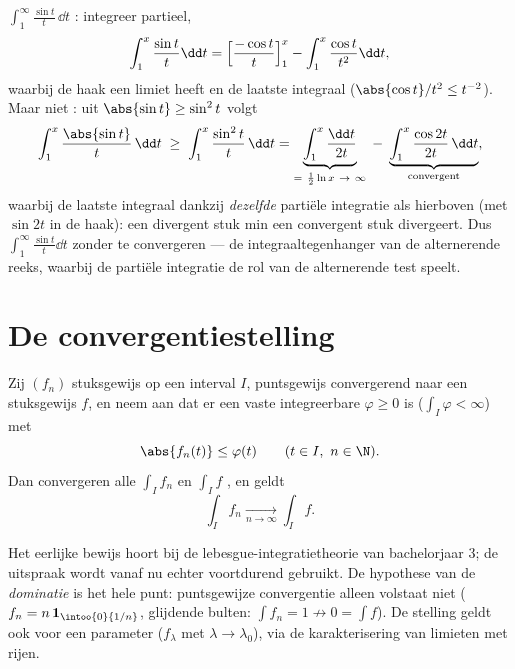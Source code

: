 \begin{example}\label{ex:b2:integration:sint}
$\displaystyle\int_1^{\infty} \frac{\sin t}{t}\,\dd t$
: integreer partieel,
\[
\int_1^x \frac{\sin t}{t}\dd t
= \Bigl[\frac{-\cos t}{t}\Bigr]_1^x - \int_1^x \frac{\cos
t}{t^2}\dd t ,
\]
waarbij de haak een limiet heeft en de laatste integraal 
 ($\abs{\cos t}/t^2 \leq t^{-2}$). Maar niet :
uit $\abs{\sin t} \geq \sin^2 t$ volgt
\[
\int_1^x \frac{\abs{\sin t}}{t}\,\dd t
\;\geq\; \int_1^x \frac{\sin^2t}{t}\,\dd t
= \underbrace{\int_1^x \frac{\dd t}{2t}}_{=\ \frac12\ln x
\ \to\ \infty}
\;-\; \underbrace{\int_1^x \frac{\cos 2t}{2t}\,\dd
t}_{\text{convergent}} ,
\]
waarbij de laatste integraal  dankzij \emph{dezelfde}
partiële integratie als hierboven (met $\sin 2t$ in de haak): een
divergent stuk min een convergent stuk divergeert. Dus 
$\int_1^\infty\frac{\sin t}{t}\dd t$ zonder  te
convergeren --- de integraaltegenhanger van de alternerende reeks,
waarbij de partiële integratie de rol van de alternerende test
speelt.
\end{example}

\section{De convergentiestelling}

\begin{theorem}\label{thm:b2:integration:dominated}
Zij $(f_n)$ stuksgewijs  op een interval $I$, puntsgewijs
convergerend naar een stuksgewijs  $f$, en neem aan dat er
een vaste integreerbare $\varphi \geq 0$ is ($\int_I \varphi <
\infty$) met
\[
\abs{f_n(t)} \leq \varphi(t) \qquad (t \in I,\ n \in \N).
\]
Dan convergeren alle $\int_I f_n$ en $\int_I f$ , en geldt
\[
\int_I f_n \xrightarrow[n \to \infty]{} \int_I f .
\]
\end{theorem}
\admitted

\begin{remark}
Het eerlijke bewijs hoort bij de lebesgue-integratietheorie van
bachelorjaar 3; de uitspraak wordt vanaf nu echter voortdurend
gebruikt. De hypothese van de \emph{dominatie} is het hele punt:
puntsgewijze convergentie alleen volstaat niet ($f_n =
n\,\mathbf{1}_{\intoo{0}{1/n}}$, glijdende bulten: $\int f_n = 1
\not\to 0 = \int f$). De stelling geldt ook voor een 
parameter ($f_\lambda$ met $\lambda \to \lambda_0$), via de
karakterisering van limieten met rijen.
\end{remark}


